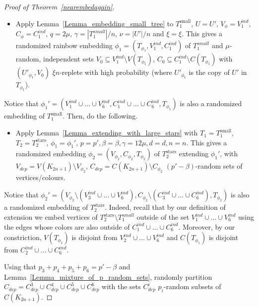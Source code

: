 \begin{proof}[Proof of Theorem~\ref{nearembedagain}]
\begin{itemize}
    \item Apply Lemma~\ref{Lemma_embedding_small_tree} to $T_1^{\mathrm{small}}$, $U=U'$, $V_\phi=V_{1}^{ind}$, $C_\phi=C_{1}^{ind}$, $q=2\mu$, $\gamma=|T_1^{small}|/n$, $\nu=|U'|/n$ and $\xi=\xi$.
This gives a  randomized rainbow embedding $\phi_1=(T_{\phi_1}, V_{1}^{ind}, C_{1}^{ind})$ of $T_1^{small}$ and  $\mu$-random, independent sets $V_0\subseteq V_{1}^{ind}\setminus V(T_{\phi_1})$, $C_0\subseteq C_{1}^{ind}\setminus C(T_{\phi_1})$ with $(U'_{\phi_1},V_0)$ $\xi n$-replete with high probability (where $U'_{\phi_1}$ is the copy of $U'$ in $T_{\phi_1}$).
\end{itemize}
Notice that $\phi_1'=(V_1^{ind}\cup \dots \cup V_6^{ind}, C_1^{ind}\cup \dots\cup C_6^{ind}, T_{\phi_1} )$ is also a  randomized embedding  of $T_1^{\mathrm{small}}$. 
Then, do the following.
\begin{itemize}
\item Apply  Lemma~\ref{Lemma_extending_with_large_stars} with $T_1=T_1^{\mathrm{small}}$, $T_2=T_2^{\mathrm{stars}}$, $\phi_1=\phi_1'$, $p=p', \beta=\beta, \gamma=12\mu, d=d, n=n$. This gives a randomized embedding $\phi_{2}=(V_{\phi_2}, C_{\phi_2}, T_{\phi_2})$ of $T_2^{\mathrm{stars}}$ extending $\phi_{1}'$, with $V_{dep}=V(K_{2n+1})\setminus V_{\phi_2}$, $C_{dep}=C(K_{2n+1})\setminus C_{\phi_2}$ $(p'-\beta)$-random sets of vertices/colours.
\end{itemize} 
Notice that $\phi_2'=(V_{\phi_2}\setminus (V_3^{ind}\cup \dots \cup V_6^{ind}), C_{\phi_2}\setminus (C_3^{ind}\cup \dots \cup C_6^{ind}), T_{\phi_2})$ is also a randomized embedding  of $T_2^{\mathrm{stars}}$. Indeed, recall that by our definition of extension we embed vertices of $T_2^{\mathrm{stars}}\setminus T_1^{small}$ outside of the set $V_1^{ind}\cup \dots \cup V_6^{ind}$ using the edges whose colors are also outside of $C_1^{ind}\cup \dots\cup C_6^{ind}$. Moreover, by our constriction, $V(T_{\phi_1})$ is disjoint from
$V_2^{ind}\cup \dots \cup V_6^{ind}$ and $C(T_{\phi_1})$ is disjoint from
$C_2^{ind}\cup \dots\cup C_6^{ind}$.

Using that $p_3+p_4+p_5+p_6 = p'-\beta$ and Lemma~\ref{Lemma_mixture_of_p_random_sets}, randomly partition $C_{dep}= C_{dep}^3\cup C_{dep}^4\cup C_{dep}^5\cup C_{dep}^6$  with the sets $C_{dep}^i$ $p_i$-random subsets of $C(K_{2n+1})$.


\end{proof}
